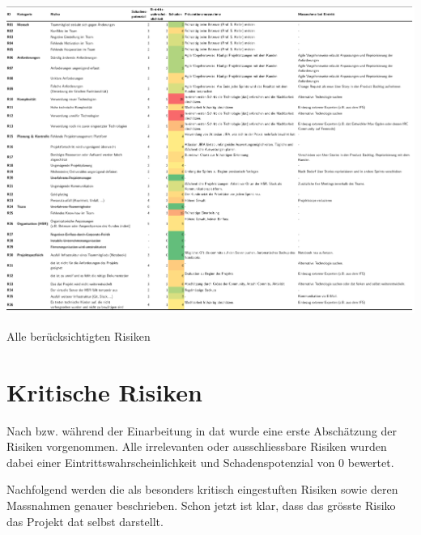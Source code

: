 \begin{landscape}
	\begin{table}[H]
		\centering
		\includegraphics[height=.9\textheight,keepaspectratio]{risikoanalyse.pdf}
		\caption{Alle berücksichtigten Risiken}
		\label{tab:risikoanalyse}
	\end{table}
\end{landscape}



\section{Kritische Risiken}
Nach bzw. während der Einarbeitung in \gls{dat} wurde eine erste Abschätzung der Risiken vorgenommen. Alle irrelevanten oder ausschliessbare Risiken wurden dabei einer Eintrittswahrscheinlichkeit und Schadenspotenzial von 0 bewertet.

Nachfolgend werden die als besonders kritisch eingestuften Risiken sowie deren Massnahmen genauer beschrieben. Schon jetzt ist klar, dass das grösste Risiko das Projekt \gls{dat} selbst darstellt.


\newcommand{\projectrisk}[4]{
\begin{tabularx}{\linewidth}{lX}
	\toprule
	\textbf{Risiko} & #1\\
	\midrule
	\textbf{Titel} & #2\\
	\textbf{Beschreibung} & #3\\
	\textbf{Prävention/Massnahme} & #4\\
	\bottomrule
\end{tabularx}	
}


